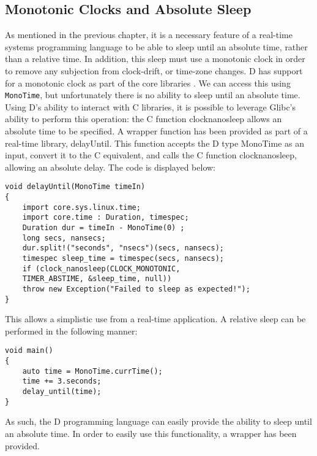 \subsection{Monotonic Clocks and Absolute Sleep}
As mentioned in the previous chapter, it is a necessary feature of a real-time 
systems programming language to be able to sleep until an absolute time, rather 
than a relative time. In addition, this sleep must use a monotonic clock in order 
to remove any subjection from clock-drift, or time-zone changes. D has support 
for a monotonic clock as part of the core libraries 
\cite{http://dlang.org/phobos/core_time.html}. We can access this using 
\texttt{MonoTime}, but unfortunately there is no ability to sleep until an 
absolute time. Using D's ability to interact with C libraries, it is possible 
to leverage Glibc's ability to perform this operation: the C function 
clock\textunderscore{}nanosleep allows an absolute time to be specified.
\cite{http://man7.org/linux/man-pages/man2/clock_nanosleep.2.html}
A wrapper function has been provided as part of a real-time library, delayUntil. 
This function accepts the D type MonoTime as an input, convert it to the C 
equivalent, and calls the C function clock\textunderscore{}nanosleep, allowing an absolute delay.
The code is displayed below: 
\begin{lstlisting}
void delayUntil(MonoTime timeIn)
{
    import core.sys.linux.time; 
    import core.time : Duration, timespec; 
    Duration dur = timeIn - MonoTime(0) ;
    long secs, nansecs; 
    dur.split!("seconds", "nsecs")(secs, nansecs); 
    timespec sleep_time = timespec(secs, nansecs); 
    if (clock_nanosleep(CLOCK_MONOTONIC, 
    TIMER_ABSTIME, &sleep_time, null))
    throw new Exception("Failed to sleep as expected!"); 
}
\end{lstlisting}
This allows a simplistic use from a real-time application. A relative sleep can 
be performed in the following manner: 
\begin{lstlisting}
void main()
{
    auto time = MonoTime.currTime(); 
    time += 3.seconds; 
    delay_until(time);
}
\end{lstlisting}
As such, the D programming language can easily provide the ability to sleep 
until an absolute time. In order to easily use this functionality, a 
wrapper has been provided.

